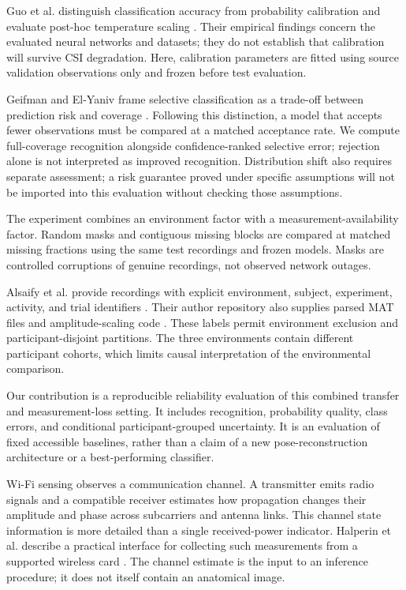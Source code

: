 \documentclass[a4paper,11pt,fleqn]{mira-author}
\makeatletter
\renewcommand\section{\@startsection{section}{1}{0pt}{8pt plus 2pt minus 1pt}{4pt}{\normalfont\fontsize{11.5}{14}\selectfont\bfseries}}
\makeatother
\begin{document}
Guo et al. distinguish classification accuracy from probability calibration and evaluate post-hoc temperature scaling \cite{guo2017}. Their empirical findings concern the evaluated neural networks and datasets; they do not establish that calibration will survive CSI degradation. Here, calibration parameters are fitted using source validation observations only and frozen before test evaluation.

Geifman and El-Yaniv frame selective classification as a trade-off between prediction risk and coverage \cite{geifman2017}. Following this distinction, a model that accepts fewer observations must be compared at a matched acceptance rate. We compute full-coverage recognition alongside confidence-ranked selective error; rejection alone is not interpreted as improved recognition. Distribution shift also requires separate assessment; a risk guarantee proved under specific assumptions will not be imported into this evaluation without checking those assumptions.

The experiment combines an environment factor with a measurement-availability factor. Random masks and contiguous missing blocks are compared at matched missing fractions using the same test recordings and frozen models. Masks are controlled corruptions of genuine recordings, not observed network outages.

Alsaify et al. provide recordings with explicit environment, subject, experiment, activity, and trial identifiers \cite{alsaify2020}. Their author repository also supplies parsed MAT files and amplitude-scaling code \cite{multienvdata}. These labels permit environment exclusion and participant-disjoint partitions. The three environments contain different participant cohorts, which limits causal interpretation of the environmental comparison.

Our contribution is a reproducible reliability evaluation of this combined transfer and measurement-loss setting. It includes recognition, probability quality, class errors, and conditional participant-grouped uncertainty. It is an evaluation of fixed accessible baselines, rather than a claim of a new pose-reconstruction architecture or a best-performing classifier.

\section{Propagation and measurement}
Wi-Fi sensing observes a communication channel. A transmitter emits radio signals and a compatible receiver estimates how propagation changes their amplitude and phase across subcarriers and antenna links. This channel state information is more detailed than a single received-power indicator. Halperin et al. describe a practical interface for collecting such measurements from a supported wireless card \cite{halperin2011}. The channel estimate is the input to an inference procedure; it does not itself contain an anatomical image.
\end{document}

